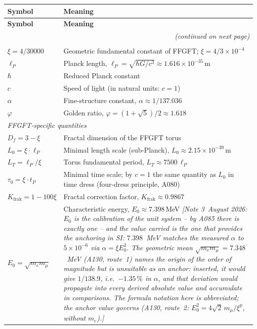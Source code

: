 \renewcommand{\arraystretch}{1.3}
{\small\setlength\tabcolsep{4pt}
\begin{longtable}{@{}p{2.6cm}p{\dimexpr\textwidth-2.8cm\relax}@{}}
\toprule
\textbf{Symbol} & \textbf{Meaning} \\
\midrule
\endfirsthead
\toprule
\textbf{Symbol} & \textbf{Meaning} \\
\midrule
\endhead
\midrule
\multicolumn{2}{r}{\textit{(continued on next page)}} \\
\endfoot
\bottomrule
\endlastfoot
\multicolumn{2}{l}{\textit{Fundamental constants and parameters}} \\
$\xi = 4/30000$ & Geometric fundamental constant of FFGFT;
  $\xi = 4/3\times10^{-4}$ \\
$\ell_P$ & Planck length, $\ell_P = \sqrt{\hbar G/c^3}
  \approx 1{.}616\times10^{-35}\,$m \\
$\hbar$ & Reduced Planck constant \\
$c$ & Speed of light (in natural units: $c=1$) \\
$\alpha$ & Fine-structure constant, $\alpha\approx1/137{.}036$ \\
$\varphi$ & Golden ratio, $\varphi=(1+\sqrt5)/2\approx1{.}618$ \\
\midrule
\multicolumn{2}{l}{\textit{FFGFT-specific quantities}} \\
$D_f = 3-\xi$ & Fractal dimension of the FFGFT torus \\
$L_0 = \xi\cdot\ell_P$ & Minimal length scale (sub-Planck),
  $L_0\approx2{.}15\times10^{-39}\,$m \\
$L_T = \ell_P/\xi$ & Torus fundamental period, $L_T\approx7500\,\ell_P$ \\
$\tau_0 = \xi\cdot t_P$ & Minimal time scale; by $c=1$ the same quantity
  as $L_0$ in time dress (four-dress principle, A080) \\
$K_\text{frak} = 1-100\xi$ & Fractal correction factor,
  $K_\text{frak}\approx0{.}9867$ \\
$E_0 = \sqrt{m_e m_\mu}$ & Characteristic energy,
  $E_0\approx7{.}398\,$MeV \emph{[Note 3~August 2026: $E_0$ is the calibration of the unit system -- by A085 there is exactly one -- and the value carried is the one that provides the anchoring in SI: $7{.}398$~MeV matches the measured $\alpha$ to $5\times10^{-6}$ via $\alpha = \xi E_0^2$. The geometric mean $\sqrt{m_em_\mu} = 7{.}348$~MeV (A130, route~1) names the origin of the order of magnitude but is unsuitable as an anchor: inserted, it would give $1/138{.}9$, i.e.\ $-1{.}35\,\%$ in $\alpha$, and that deviation would propagate into every derived absolute value and accumulate in comparisons. The formula notation here is abbreviated; the anchor value governs (A130, route~2: $E_0^2 = 4\sqrt2\,m_\mu/\xi^{p}$, without $m_e$).]} \\

\end{longtable}}
